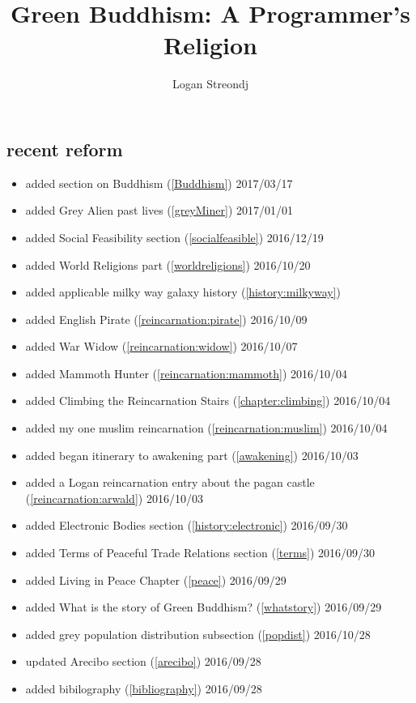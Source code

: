 \documentclass[10pt]{report}
\title{Green Buddhism: A Programmer's Religion}
\author{Logan Streondj \\
  \doclicenseName}
\begin{document}
\begin{titlepage}
\maketitle

\section{recent reform}
\begin{itemize}
  \item added section on Buddhism (\ref{Buddhism}) 2017/03/17
  \item added Grey Alien past lives (\ref{greyMiner}) 2017/01/01
  \item added Social Feasibility section (\ref{socialfeasible}) 2016/12/19
  \item added World Religions part (\ref{worldreligions}) 2016/10/20
  \item added applicable milky way galaxy history (\ref{history:milkyway})
  \item added English Pirate (\ref{reincarnation:pirate}) 2016/10/09
  \item added War Widow (\ref{reincarnation:widow}) 2016/10/07
  \item added Mammoth Hunter (\ref{reincarnation:mammoth}) 2016/10/04
  \item added Climbing the Reincarnation Stairs (\ref{chapter:climbing})
2016/10/04
  \item added my one muslim reincarnation (\ref{reincarnation:muslim})
2016/10/04
  \item added began itinerary to awakening part (\ref{awakening}) 2016/10/03
  \item added a Logan reincarnation entry about the pagan castle
(\ref{reincarnation:arwald}) 2016/10/03
  \item added Electronic Bodies section (\ref{history:electronic}) 2016/09/30
  \item added Terms of Peaceful Trade Relations section (\ref{terms}) 2016/09/30
  \item added Living in Peace Chapter (\ref{peace}) 2016/09/29
  \item added What is the story of Green Buddhism? (\ref{whatstory}) 2016/09/29
  \item added grey population distribution subsection (\ref{popdist})
2016/10/28
 \item updated Arecibo section (\ref{arecibo}) 2016/09/28
 \item added bibilography (\ref{bibliography}) 2016/09/28
\end{itemize}
\end{titlepage}
\tableofcontents
 




\printbibliography{}\label{bibliography}
\end{document}
